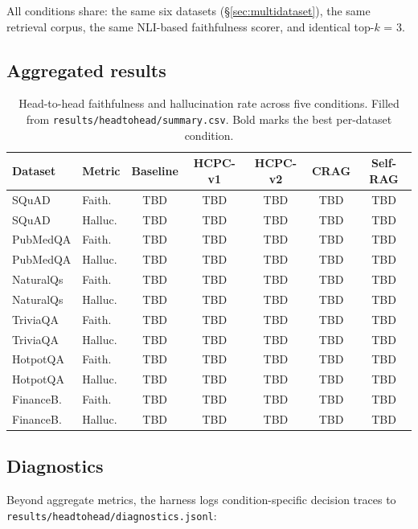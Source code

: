 All conditions share: the same six datasets (§\ref{sec:multidataset}),
the same retrieval corpus, the same NLI-based faithfulness scorer, and
identical top-$k$ = 3.

\subsection{Aggregated results}

\begin{table}[!htbp]
\centering
\caption{Head-to-head faithfulness and hallucination rate across five
conditions. Filled from \texttt{results/headtohead/summary.csv}. Bold
marks the best per-dataset condition.}
\label{tab:headtohead}
\small
\begin{tabular}{llccccc}
\toprule
Dataset & Metric & Baseline & HCPC-v1 & HCPC-v2 & CRAG & Self-RAG \\
\midrule
SQuAD       & Faith.   & TBD & TBD & TBD & TBD & TBD \\
SQuAD       & Halluc.  & TBD & TBD & TBD & TBD & TBD \\
PubMedQA    & Faith.   & TBD & TBD & TBD & TBD & TBD \\
PubMedQA    & Halluc.  & TBD & TBD & TBD & TBD & TBD \\
NaturalQs   & Faith.   & TBD & TBD & TBD & TBD & TBD \\
NaturalQs   & Halluc.  & TBD & TBD & TBD & TBD & TBD \\
TriviaQA    & Faith.   & TBD & TBD & TBD & TBD & TBD \\
TriviaQA    & Halluc.  & TBD & TBD & TBD & TBD & TBD \\
HotpotQA    & Faith.   & TBD & TBD & TBD & TBD & TBD \\
HotpotQA    & Halluc.  & TBD & TBD & TBD & TBD & TBD \\
FinanceB.   & Faith.   & TBD & TBD & TBD & TBD & TBD \\
FinanceB.   & Halluc.  & TBD & TBD & TBD & TBD & TBD \\
\bottomrule
\end{tabular}
\end{table}

\subsection{Diagnostics}

Beyond aggregate metrics, the harness logs condition-specific decision
traces to \texttt{results/headtohead/diagnostics.jsonl}:

